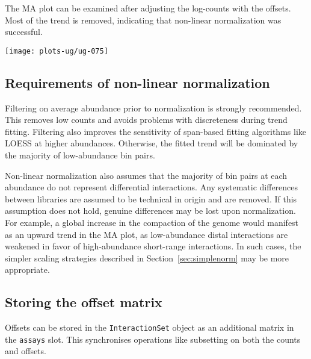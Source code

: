 \documentclass[12pt]{report}
\renewenvironment{Schunk}{\vspace{0pt}}{\vspace{0pt}}
\newcommand{\code}[1]{{\small\texttt{#1}}}
\begin{document}
The MA plot can be examined after adjusting the log-counts with the offsets.
Most of the trend is removed, indicating that non-linear normalization was successful.


\begin{Schunk}
\end{Schunk}

\begin{center}
\texttt{[image: plots-ug/ug-075]}
\end{center}

\subsection{Requirements of non-linear normalization}
Filtering on average abundance prior to normalization is strongly recommended.
This removes low counts and avoids problems with discreteness during trend fitting.
Filtering also improves the sensitivity of span-based fitting algorithms like LOESS at higher abundances.
Otherwise, the fitted trend will be dominated by the majority of low-abundance bin pairs.

Non-linear normalization also assumes that the majority of bin pairs at each abundance do not represent differential interactions.
Any systematic differences between libraries are assumed to be technical in origin and are removed.
If this assumption does not hold, genuine differences may be lost upon normalization.
For example, a global increase in the compaction of the genome would manifest as an upward trend in the MA plot, as low-abundance distal interactions are weakened in favor of high-abundance short-range interactions.
In such cases, the simpler scaling strategies described in Section~\ref{sec:simplenorm} may be more appropriate.

\subsection{Storing the offset matrix}
Offsets can be stored in the \code{InteractionSet} object as an additional matrix in the \code{assays} slot.
This synchronises operations like subsetting on both the counts and offsets.
\end{document}
